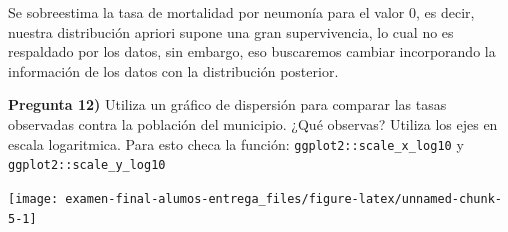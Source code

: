 \documentclass[
]{article}
\newenvironment{Shaded}{\begin{snugshade}}{\end{snugshade}}
\newcommand{\DataTypeTok}[1]{\textcolor[rgb]{0.13,0.29,0.53}{#1}}
\newcommand{\KeywordTok}[1]{\textcolor[rgb]{0.13,0.29,0.53}{\textbf{#1}}}
\newcommand{\NormalTok}[1]{#1}
\newcommand{\OperatorTok}[1]{\textcolor[rgb]{0.81,0.36,0.00}{\textbf{#1}}}
\newcommand{\StringTok}[1]{\textcolor[rgb]{0.31,0.60,0.02}{#1}}
\begin{document}
Se sobreestima la tasa de mortalidad por neumonía para el valor \(0\),
es decir, nuestra distribución apriori supone una gran supervivencia, lo
cual no es respaldado por los datos, sin embargo, eso buscaremos cambiar
incorporando la información de los datos con la distribución posterior.

\textbf{Pregunta 12)} Utiliza un gráfico de dispersión para comparar las
tasas observadas contra la población del municipio. ¿Qué observas?
Utiliza los ejes en escala logaritmica. Para esto checa la función:
\texttt{ggplot2::scale\_x\_log10} y \texttt{ggplot2::scale\_y\_log10}

\begin{Shaded}
\end{Shaded}

\begin{center}\texttt{[image: examen-final-alumos-entrega\_files/figure-latex/unnamed-chunk-5-1]} \end{center}

\begin{Shaded}
\end{Shaded}
\end{document}
